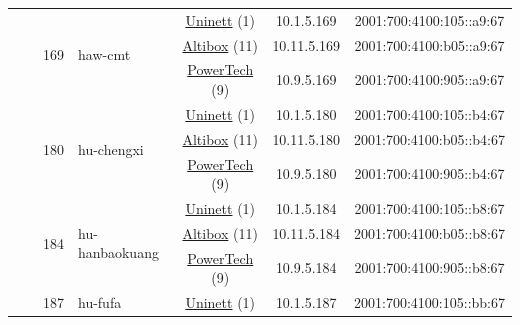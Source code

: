 \begin{small}
\begin{center}
\begin{longtable}{|c|c|c|c|c|c|c|c|}
  &  & \multirow{3}{*}{\tiny{169}} & \multicolumn{1}{|l|}{\multirow{3}{*}{\tiny{haw-cmt}}} & \multicolumn{2}{|c|}{\tiny{\href{https://www.uninett.no}{Uninett} (1)}} & \tiny{10.1.5.169} & \tiny{2001:700:4100:105::a9:67} \\* \cline{5-5}\cline{6-6}\cline{7-7}\cline{8-8}
  &  &  &  & \multicolumn{2}{|c|}{\tiny{\href{https://www.altibox.no}{Altibox} (11)}} & \tiny{10.11.5.169} & \tiny{2001:700:4100:b05::a9:67} \\* \cline{5-5}\cline{6-6}\cline{7-7}\cline{8-8}
  &  &  &  & \multicolumn{2}{|c|}{\tiny{\href{http://www.powertech.no}{PowerTech} (9)}} & \tiny{10.9.5.169} & \tiny{2001:700:4100:905::a9:67} \\* \cline{3-3}\cline{4-4}\cline{5-5}\cline{6-6}\cline{7-7}\cline{8-8}
  &  & \multirow{3}{*}{\tiny{180}} & \multicolumn{1}{|l|}{\multirow{3}{*}{\tiny{hu-chengxi}}} & \multicolumn{2}{|c|}{\tiny{\href{https://www.uninett.no}{Uninett} (1)}} & \tiny{10.1.5.180} & \tiny{2001:700:4100:105::b4:67} \\* \cline{5-5}\cline{6-6}\cline{7-7}\cline{8-8}
  &  &  &  & \multicolumn{2}{|c|}{\tiny{\href{https://www.altibox.no}{Altibox} (11)}} & \tiny{10.11.5.180} & \tiny{2001:700:4100:b05::b4:67} \\* \cline{5-5}\cline{6-6}\cline{7-7}\cline{8-8}
  &  &  &  & \multicolumn{2}{|c|}{\tiny{\href{http://www.powertech.no}{PowerTech} (9)}} & \tiny{10.9.5.180} & \tiny{2001:700:4100:905::b4:67} \\* \cline{3-3}\cline{4-4}\cline{5-5}\cline{6-6}\cline{7-7}\cline{8-8}
  &  & \multirow{3}{*}{\tiny{184}} & \multicolumn{1}{|l|}{\multirow{3}{*}{\tiny{hu-hanbaokuang}}} & \multicolumn{2}{|c|}{\tiny{\href{https://www.uninett.no}{Uninett} (1)}} & \tiny{10.1.5.184} & \tiny{2001:700:4100:105::b8:67} \\* \cline{5-5}\cline{6-6}\cline{7-7}\cline{8-8}
  &  &  &  & \multicolumn{2}{|c|}{\tiny{\href{https://www.altibox.no}{Altibox} (11)}} & \tiny{10.11.5.184} & \tiny{2001:700:4100:b05::b8:67} \\* \cline{5-5}\cline{6-6}\cline{7-7}\cline{8-8}
  &  &  &  & \multicolumn{2}{|c|}{\tiny{\href{http://www.powertech.no}{PowerTech} (9)}} & \tiny{10.9.5.184} & \tiny{2001:700:4100:905::b8:67} \\* \cline{3-3}\cline{4-4}\cline{5-5}\cline{6-6}\cline{7-7}\cline{8-8}
  &  & \multirow{3}{*}{\tiny{187}} & \multicolumn{1}{|l|}{\multirow{3}{*}{\tiny{hu-fufa}}} & \multicolumn{2}{|c|}{\tiny{\href{https://www.uninett.no}{Uninett} (1)}} & \tiny{10.1.5.187} & \tiny{2001:700:4100:105::bb:67} \\* \cline{5-5}\cline{6-6}\cline{7-7}\cline{8-8}

\end{longtable}
\end{center}
\end{small}
